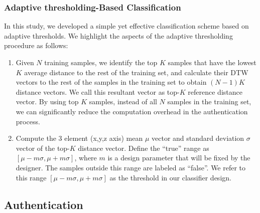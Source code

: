 \subsubsection{Adaptive thresholding-Based Classification}
\fi
In this study, we developed a simple yet effective classification scheme based on adaptive thresholds. We highlight the aspects of the adaptive thresholding procedure as follows:

\begin{enumerate}

\item Given $N$ training samples, we identify the top $K$ samples that have the lowest $K$ average distance to the rest of the
training set, and calculate their DTW vectors to the rest of the samples in the training set to obtain $(N-1)K$ distance vectors. We call this resultant vector as top-$K$ reference distance vector. By using top $K$ samples, instead of all $N$ samples in the training set, we can significantly reduce the computation overhead in the authentication process.


\item Compute the 3 element (x,y,z axis) mean $\mu$ vector and standard
deviation $\sigma$ vector of the top-$K$ distance vector. Define the
``true'' range as $[\mu-m\sigma, \mu+m\sigma]$, where $m$ is a design
parameter that will be fixed by the designer. The samples outside this
range are labeled as ``false''.
We refer to this range $[\mu-m\sigma, \mu+m\sigma]$ as the threshold in our
classifier design.
\end{enumerate}

\iffalse
\subsection{Authentication}

